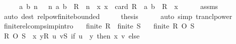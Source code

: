 \begin{isabellebody}
%
\isadelimproof
%
\endisadelimproof
%
\isatagproof
{}\isamarkupfalse%
\ {\isacharminus}{\kern0pt}\isanewline
\ \ \isamarkupfalse%
\ {\isachardoublequoteopen}{\isasymAnd}a\ b\ n{\isachardot}{\kern0pt}\ {\isasymlbrakk}{}\ {\isacharless}{\kern0pt}\ n{\isacharsemicolon}{\kern0pt}\ {\isacharparenleft}{\kern0pt}a{\isacharcomma}{\kern0pt}\ b{\isacharparenright}{\kern0pt}\ {\isasymin}\ R\ {\isacharcircum}{\kern0pt}{\isacharcircum}{\kern0pt}\ n{\isasymrbrakk}\ {\isasymLongrightarrow}\ {\isasymexists}x{\isachargreater}{\kern0pt}{}{\isachardot}{\kern0pt}\ x\ {\isasymle}\ card\ R\ {\isasymand}\ {\isacharparenleft}{\kern0pt}a{\isacharcomma}{\kern0pt}\ b{\isacharparenright}{\kern0pt}\ {\isasymin}\ R\ {\isacharcircum}{\kern0pt}{\isacharcircum}{\kern0pt}\ x{\isachardoublequoteclose}\isanewline
\ \ \ \ \isamarkupfalse%
\ assms\ \isamarkupfalse%
\ {\isacharparenleft}{\kern0pt}auto\ dest{\isacharcolon}{\kern0pt}\ relpow{\isacharunderscore}{\kern0pt}finite{\isacharunderscore}{\kern0pt}bounded{}{\isacharparenright}{\kern0pt}\isanewline
\ \ \isamarkupfalse%
\ \isamarkupfalse%
\ {\isacharquery}{\kern0pt}thesis\isanewline
\ \ \ \ \isamarkupfalse%
\ {\isacharparenleft}{\kern0pt}auto\ simp{\isacharcolon}{\kern0pt}\ trancl{\isacharunderscore}{\kern0pt}power{\isacharparenright}{\kern0pt}\isanewline
{}\isamarkupfalse%
%
\endisatagproof
{\isafoldproof}%
%
\isadelimproof
\isanewline
%
\endisadelimproof
\isanewline
{}\isamarkupfalse%
\ finite{\isacharunderscore}{\kern0pt}relcomp{\isacharbrackleft}{\kern0pt}simp{\isacharcomma}{\kern0pt}intro{\isacharbrackright}{\kern0pt}{\isacharcolon}{\kern0pt}\isanewline
\ \ \ {\isachardoublequoteopen}finite\ R{\isachardoublequoteclose}\ \ {\isachardoublequoteopen}finite\ S{\isachardoublequoteclose}\isanewline
\ \ \ {\isachardoublequoteopen}finite\ {\isacharparenleft}{\kern0pt}R\ O\ S{\isacharparenright}{\kern0pt}{\isachardoublequoteclose}\isanewline
%
\isadelimproof
%
\endisadelimproof
%
\isatagproof
{}\isamarkupfalse%
{\isacharminus}{\kern0pt}\isanewline
\ \ \isamarkupfalse%
\ {\isachardoublequoteopen}R\ O\ S\ {\isacharequal}{\kern0pt}\ {\isacharparenleft}{\kern0pt}{\isasymUnion}{\isacharparenleft}{\kern0pt}x{\isacharcomma}{\kern0pt}\ y{\isacharparenright}{\kern0pt}{\isasymin}R{\isachardot}{\kern0pt}\ {\isasymUnion}{\isacharparenleft}{\kern0pt}u{\isacharcomma}{\kern0pt}\ v{\isacharparenright}{\kern0pt}{\isasymin}S{\isachardot}{\kern0pt}\ if\ u\ {\isacharequal}{\kern0pt}\ y\ then\ {\isacharbraceleft}{\kern0pt}{\isacharparenleft}{\kern0pt}x{\isacharcomma}{\kern0pt}\ v{\isacharparenright}{\kern0pt}{\isacharbraceright}{\kern0pt}\ else\ {\isacharbraceleft}{\kern0pt}{\isacharbraceright}{\kern0pt}{\isacharparenright}{\kern0pt}{\isachardoublequoteclose}\isanewline

\end{isabellebody}
